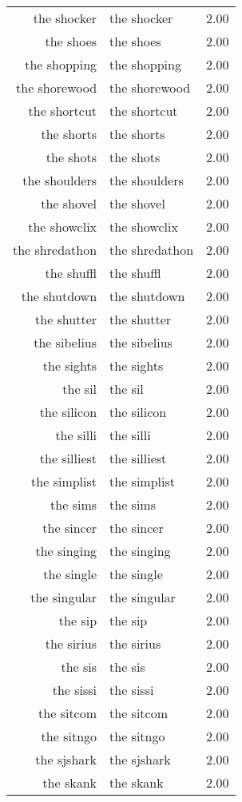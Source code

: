\begin{table}[ht]
\begin{tabular}{rlr}
  the shocker & the shocker & 2.00 \\ 
  the shoes & the shoes & 2.00 \\ 
  the shopping & the shopping & 2.00 \\ 
  the shorewood & the shorewood & 2.00 \\ 
  the shortcut & the shortcut & 2.00 \\ 
  the shorts & the shorts & 2.00 \\ 
  the shots & the shots & 2.00 \\ 
  the shoulders & the shoulders & 2.00 \\ 
  the shovel & the shovel & 2.00 \\ 
  the showclix & the showclix & 2.00 \\ 
  the shredathon & the shredathon & 2.00 \\ 
  the shuffl & the shuffl & 2.00 \\ 
  the shutdown & the shutdown & 2.00 \\ 
  the shutter & the shutter & 2.00 \\ 
  the sibelius & the sibelius & 2.00 \\ 
  the sights & the sights & 2.00 \\ 
  the sil & the sil & 2.00 \\ 
  the silicon & the silicon & 2.00 \\ 
  the silli & the silli & 2.00 \\ 
  the silliest & the silliest & 2.00 \\ 
  the simplist & the simplist & 2.00 \\ 
  the sims & the sims & 2.00 \\ 
  the sincer & the sincer & 2.00 \\ 
  the singing & the singing & 2.00 \\ 
  the single & the single & 2.00 \\ 
  the singular & the singular & 2.00 \\ 
  the sip & the sip & 2.00 \\ 
  the sirius & the sirius & 2.00 \\ 
  the sis & the sis & 2.00 \\ 
  the sissi & the sissi & 2.00 \\ 
  the sitcom & the sitcom & 2.00 \\ 
  the sitngo & the sitngo & 2.00 \\ 
  the sjshark & the sjshark & 2.00 \\ 
  the skank & the skank & 2.00 \\ 

\end{tabular}
\end{table}
